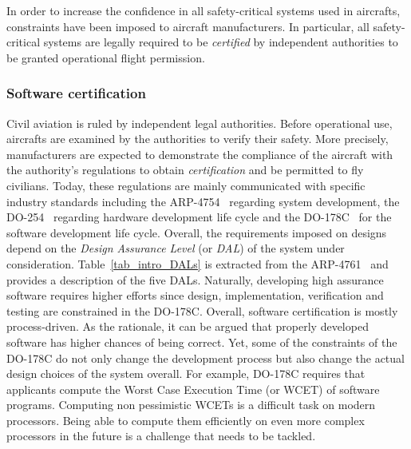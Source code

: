 \documentclass[main.tex]{subfiles}
\begin{document}
In order to increase the confidence in all safety-critical systems used in aircrafts, constraints have been imposed to aircraft manufacturers. In particular, all safety-critical systems are legally required to be \emph{certified} by independent authorities to be granted operational flight permission.

\subsubsection{Software certification}
Civil aviation is ruled by independent legal authorities. Before operational use, aircrafts are examined by the authorities to verify their safety. More precisely, manufacturers are expected to demonstrate the compliance of the aircraft with the authority's regulations to obtain \emph{certification} and be permitted to fly civilians. Today, these regulations are mainly communicated with specific industry standards including the ARP-4754~\cite{arp4754} regarding system development, the DO-254~\cite{do178} regarding hardware development life cycle and the DO-178C~\cite{do178} for the software development life cycle.
Overall, the requirements imposed on designs depend on the \emph{Design Assurance Level} (or \emph{DAL}) of the system under consideration. Table~\ref{tab_intro_DALs} is extracted from the ARP-4761~\cite{arp4761} and provides a description of the five DALs. Naturally, developing high assurance software requires higher efforts since design, implementation, verification and testing are constrained in the DO-178C. 
Overall, software certification is mostly process-driven. As the rationale, it can be argued that properly developed software has higher chances of being correct. Yet, some of the constraints of the DO-178C do not only change the development process but also change the actual design choices of the system overall. For example, DO-178C requires that applicants compute the Worst Case Execution Time (or WCET) of software programs. Computing non pessimistic WCETs is a difficult task on modern processors. Being able to compute them efficiently on even more complex processors in the future is a challenge that needs to be tackled.
\end{document}
